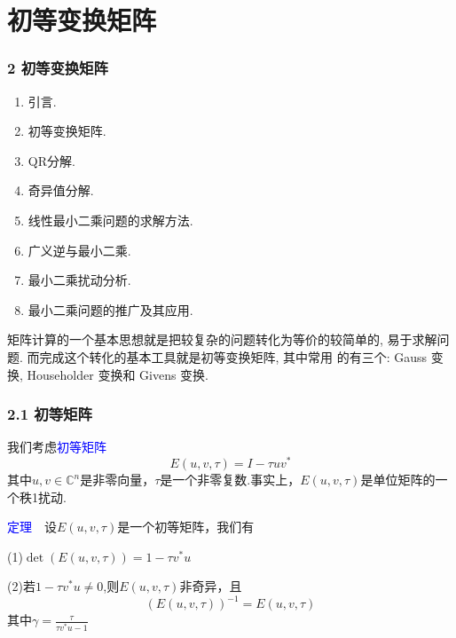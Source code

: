 \documentclass[notheorems,serif]{beamer}
\begin{document}
\section{初等变换矩阵}
\begin{frame}
\frametitle{2 初等变换矩阵}
{\scriptsize
\begin{enumerate}[2.1]
	\item {引言}.
	\item {初等变换矩阵}.
	\item {QR分解}.
	\item {奇异值分解}.
	\item {线性最小二乘问题的求解方法}.
	\item {广义逆与最小二乘}. 
	\item { 最小二乘扰动分析}. 
	\item {最小二乘问题的推广及其应用}.
\end{enumerate}
}

矩阵计算的一个基本思想就是把较复杂的问题转化为等价的较简单的,
易于求解问题. 而完成这个转化的基本工具就是初等变换矩阵, 其中常用
的有三个: Gauss 变换, Householder 变换和 Givens 变换.
\end{frame}

\begin{frame}
\frametitle{2.1 初等矩阵}
\noindent 我们考虑\textcolor{blue}{初等矩阵}$$E(u, v, \tau)=I-\tau u v^*$$
其中$u,v\in \mathbb{C}^n$是非零向量，$\tau$是一个非零复数.事实上，$E(u,v,\tau)$是单位矩阵的一个秩1扰动.

\noindent \textcolor{blue}{定理}~~设$E(u,v,\tau)$是一个初等矩阵，我们有

(1)$\operatorname{det}(E(u, v, \tau))=1-\tau v^{*} u$

(2)若$1-\tau v^* u \neq 0$,则$E(u,v,\tau)$非奇异，且
$$(E(u,v,\tau))^{-1}=E(u,v,\tau)$$
其中$\gamma=\frac{\tau}{\tau v^{*} u-1}$
\end{frame}
\end{document}
